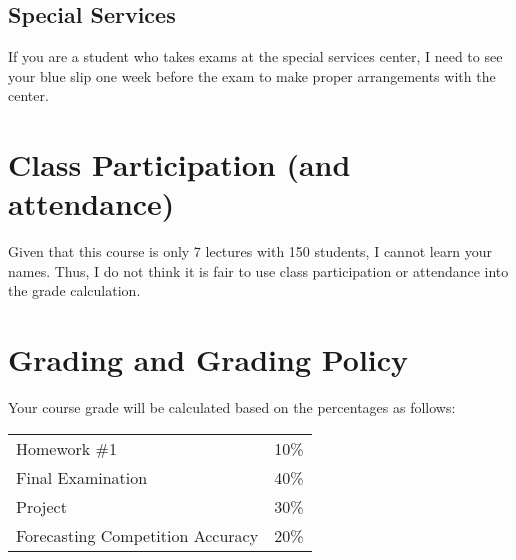 \documentclass[12pt]{article}
\newcommand{\qu}[1]{``#1''}
\begin{document}
%


%

\subsection*{Special Services}

If you are a student who takes exams at the special services center, I need to see your blue slip one week before the exam to make proper arrangements with the center.

\section*{Class Participation (and attendance)}

Given that this course is only 7 lectures with 150 students, I cannot learn your names. Thus, I do not think it is fair to use class participation or attendance into the grade calculation.


\section*{Grading and Grading Policy}\label{sec:grading}

Your course grade will be calculated based on the percentages as follows: 

\begin{table}[htp]
\centering
\begin{tabular}{l|l}
Homework \#1 & 10\% \\
Final Examination & 40\% \\
Project & 30\% \\
Forecasting Competition Accuracy & 20\% \\
\end{tabular}
\end{table}
\FloatBarrier
\end{document}
